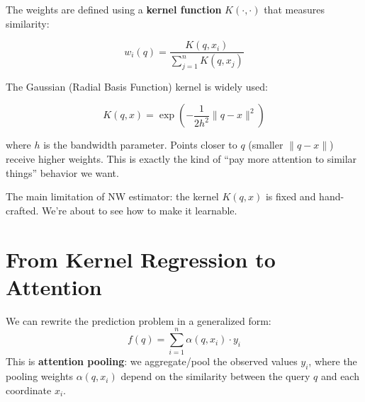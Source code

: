 \documentclass{article}
\begin{document}
The weights are defined using a \textbf{kernel function} $K(\cdot, \cdot)$ that measures similarity:

\begin{equation}
w_i(q) = \frac{K(q, x_i)}{\sum_{j=1}^{n} K(q, x_j)}
\end{equation}

\begin{center}
\end{center}

The Gaussian (Radial Basis Function) kernel is widely used:

\begin{equation}
K(q, x) = \exp\left(-\frac{1}{2h^2}\|q - x\|^2\right)
\end{equation}

where $h$ is the bandwidth parameter. Points closer to $q$ (smaller $\|q - x\|$) receive higher weights. This is exactly the kind of ``pay more attention to similar things'' behavior we want.

The main limitation of NW estimator: the kernel $K(q, x)$ is fixed and hand-crafted. We're about to see how to make it learnable.

\section{From Kernel Regression to Attention}
We can rewrite the prediction problem in a generalized form:
\begin{equation}
f(q) = \sum_{i=1}^{n} \alpha(q, x_i) \cdot y_i
\end{equation}
This is \textbf{attention pooling}: we aggregate/pool the observed values $y_i$, where the pooling weights $\alpha(q, x_i)$ depend on the similarity between the query $q$ and each coordinate $x_i$.
\end{document}
